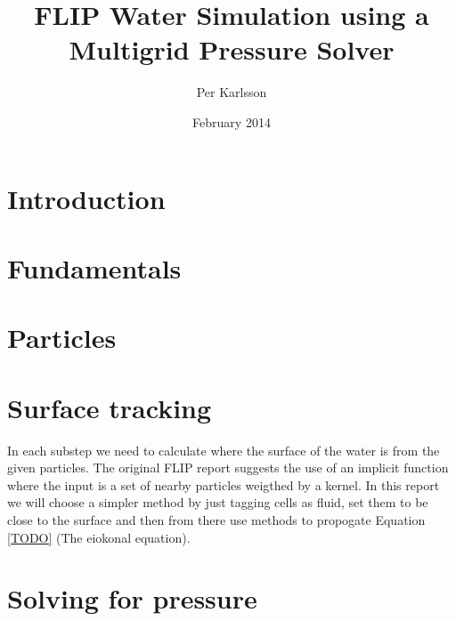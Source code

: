 \documentclass[a4paper,12pt]{article}
\begin{document}
\title{FLIP Water Simulation using a Multigrid Pressure Solver}
\author{Per Karlsson}
\date{February 2014}
\maketitle



\tableofcontents
\setcounter{tocdepth}{2}

\newpage
\section{Introduction}




\newpage
\section{Fundamentals}






\newpage
\section{Particles}





\newpage
\section{Surface tracking}
In each substep we need to calculate where the surface of the water is from the given particles. The original FLIP report suggests the use of an implicit function where the input is a set of nearby particles weigthed by a kernel. In this report we will choose a simpler method by just tagging cells as fluid, set them to be close to the surface and then from there use methods to propogate Equation \ref{TODO} (The eiokonal equation).




\newpage
\section{Solving for pressure}








\newpage

\end{document}
